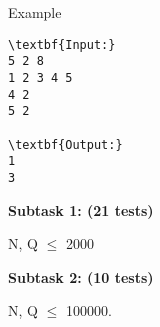Example
\begin{verbatim}
\textbf{Input:}
5 2 8
1 2 3 4 5
4 2
5 2

\textbf{Output:}
1
3\end{verbatim}

\textbf{Subtask 1: (21 tests) }

N, Q  $\le$  2000

\textbf{Subtask 2: (10 tests) }

N, Q  $\le$  100000.